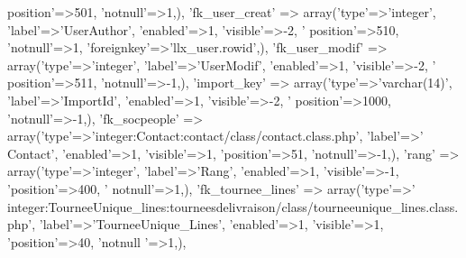 \begin{DoxyCode}
{      position'}=>501, \textcolor{stringliteral}{'notnull'}=>1,),
        \textcolor{stringliteral}{'fk\_user\_creat'} => array(\textcolor{stringliteral}{'type'}=>\textcolor{stringliteral}{'integer'}, \textcolor{stringliteral}{'label'}=>\textcolor{stringliteral}{'UserAuthor'}, \textcolor{stringliteral}{'enabled'}=>1, \textcolor{stringliteral}{'visible'}=>-2, \textcolor{stringliteral}{'
      position'}=>510, \textcolor{stringliteral}{'notnull'}=>1, \textcolor{stringliteral}{'foreignkey'}=>\textcolor{stringliteral}{'llx\_user.rowid'},),
        \textcolor{stringliteral}{'fk\_user\_modif'} => array(\textcolor{stringliteral}{'type'}=>\textcolor{stringliteral}{'integer'}, \textcolor{stringliteral}{'label'}=>\textcolor{stringliteral}{'UserModif'}, \textcolor{stringliteral}{'enabled'}=>1, \textcolor{stringliteral}{'visible'}=>-2, \textcolor{stringliteral}{'
      position'}=>511, \textcolor{stringliteral}{'notnull'}=>-1,),
        \textcolor{stringliteral}{'import\_key'} => array(\textcolor{stringliteral}{'type'}=>\textcolor{stringliteral}{'varchar(14)'}, \textcolor{stringliteral}{'label'}=>\textcolor{stringliteral}{'ImportId'}, \textcolor{stringliteral}{'enabled'}=>1, \textcolor{stringliteral}{'visible'}=>-2, \textcolor{stringliteral}{'
      position'}=>1000, \textcolor{stringliteral}{'notnull'}=>-1,),
        \textcolor{stringliteral}{'fk\_socpeople'} => array(\textcolor{stringliteral}{'type'}=>\textcolor{stringliteral}{'integer:Contact:contact/class/contact.class.php'}, \textcolor{stringliteral}{'label'}=>\textcolor{stringliteral}{'
      Contact'}, \textcolor{stringliteral}{'enabled'}=>1, \textcolor{stringliteral}{'visible'}=>1, \textcolor{stringliteral}{'position'}=>51, \textcolor{stringliteral}{'notnull'}=>-1,),
        \textcolor{stringliteral}{'rang'} => array(\textcolor{stringliteral}{'type'}=>\textcolor{stringliteral}{'integer'}, \textcolor{stringliteral}{'label'}=>\textcolor{stringliteral}{'Rang'}, \textcolor{stringliteral}{'enabled'}=>1, \textcolor{stringliteral}{'visible'}=>-1, \textcolor{stringliteral}{'position'}=>400, \textcolor{stringliteral}{'
      notnull'}=>1,),
        \textcolor{stringliteral}{'fk\_tournee\_lines'} => array(\textcolor{stringliteral}{'type'}=>\textcolor{stringliteral}{'
      integer:TourneeUnique\_lines:tourneesdelivraison/class/tourneeunique\_lines.class.php'}, \textcolor{stringliteral}{'label'}=>\textcolor{stringliteral}{'TourneeUnique\_Lines'}, \textcolor{stringliteral}{'enabled'}=>1, \textcolor{stringliteral}{'visible'}=>1, \textcolor{stringliteral}{'position'}=>40, \textcolor{stringliteral}{'notnull
      '}=>1,),

\end{DoxyCode}
